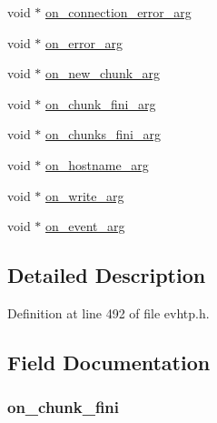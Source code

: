 \begin{DoxyCompactItemize}
\item 
void $\ast$ \hyperlink{structevhtp__hooks__s_abc38a856bb69cd4e9fe2db1c1e936611}{on\-\_\-connection\-\_\-error\-\_\-arg}
\item 
void $\ast$ \hyperlink{structevhtp__hooks__s_aef67e2ec495e223340f3daea5448a69a}{on\-\_\-error\-\_\-arg}
\item 
void $\ast$ \hyperlink{structevhtp__hooks__s_a4607065d4c6f3cf520d7bc1988f2dfb4}{on\-\_\-new\-\_\-chunk\-\_\-arg}
\item 
void $\ast$ \hyperlink{structevhtp__hooks__s_a1f6538f0edf009f607c913eaf0400a1a}{on\-\_\-chunk\-\_\-fini\-\_\-arg}
\item 
void $\ast$ \hyperlink{structevhtp__hooks__s_a523b6dd10fc474231833827481d802b9}{on\-\_\-chunks\-\_\-fini\-\_\-arg}
\item 
void $\ast$ \hyperlink{structevhtp__hooks__s_a5de675ef167086ff6492082337130b2f}{on\-\_\-hostname\-\_\-arg}
\item 
void $\ast$ \hyperlink{structevhtp__hooks__s_a9aa579b8a735219a73e5e37c390a9580}{on\-\_\-write\-\_\-arg}
\item 
void $\ast$ \hyperlink{structevhtp__hooks__s_a1f1c20b3db724c0a7a42f068d6451734}{on\-\_\-event\-\_\-arg}
\end{DoxyCompactItemize}


\subsection{Detailed Description}


Definition at line 492 of file evhtp.\-h.



\subsection{Field Documentation}
\hypertarget{structevhtp__hooks__s_a7905e89a5d4086104635ddc867e02fe1}{
\subsubsection[{on\-\_\-chunk\-\_\-fini}]{ on\-\_\-chunk\-\_\-fini}}\label{structevhtp__hooks__s_a7905e89a5d4086104635ddc867e02fe1}


